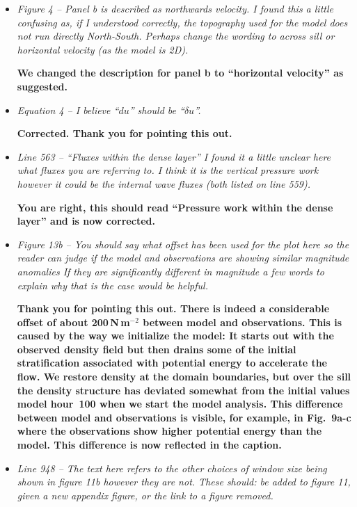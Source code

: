 \documentclass[11pt]{article}
\begin{document}
\begin{flushleft}
\begin{itemize}
\item \it
Figure 4 -- Panel b is described as northwards velocity. I found this a little confusing as, if I understood correctly, the topography used for the model does not run directly North-South. Perhaps change the wording to across sill or horizontal velocity (as the model is 2D).

\bf
We changed the description for panel b to ``horizontal velocity'' as suggested.

\item \it
Equation 4 -- I believe ``$du$'' should be ``$\delta u$''.

\bf
Corrected. Thank you for pointing this out.

\item \it
Line 563 -- ``Fluxes within the dense layer'' I found it a little unclear here what fluxes you are referring to. I think it is the vertical pressure work however it could be the internal wave fluxes (both listed on line 559).

\bf
You are right, this should read ``Pressure work within the dense layer'' and is now corrected.

\item \it
Figure 13b -- You should say what offset has been used for the plot here so the reader can judge if the model and observations are showing similar magnitude anomalies If they are significantly different in magnitude a few words to explain why that is the case would be helpful.

\bf
Thank you for pointing this out. There is indeed a considerable offset of about 200\,N\,m$^{-2}$ between model and observations. This is caused by the way we initialize the model: It starts out with the observed density field but then drains some of the initial stratification associated with potential energy to accelerate the flow. We restore density at the domain boundaries, but over the sill the density structure has deviated somewhat from the initial values model hour~100 when we start the model analysis. This difference between model and observations is visible, for example, in Fig.~9a-c where the observations show higher potential energy than the model. This difference is now reflected in the caption. 

\item \it
Line 948 -- The text here refers to the other choices of window size being shown in figure 11b however they are not. These should: be added to figure 11, given a new appendix figure, or the link to a figure removed.


\end{itemize}
\end{flushleft}
\end{document}

